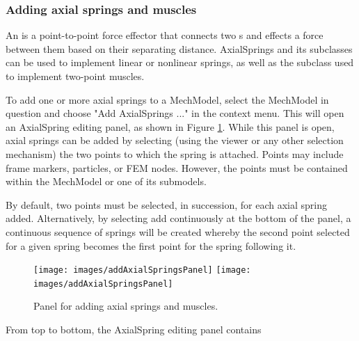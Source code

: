 \documentclass{article}
\begin{document}
\subsubsection{Adding axial springs and muscles}
\label{addingAxialSpringsSec}

An  is a point-to-point
force effector that connects two
s and effects a force between
them based on their separating distance. AxialSprings and its
subclasses can be used to implement linear or nonlinear springs, as
well as the subclass  used to
implement two-point muscles.

To add one or more axial springs to a MechModel, select the MechModel in
question and choose {\sf "Add AxialSprings ..."} in the context menu. This
will open an AxialSpring editing panel, as shown in
Figure \ref{addAxialSpringsPanelFig}. While this panel is open, axial springs can
be added by selecting (using the viewer or any other selection
mechanism) the two points to which the spring is attached.  Points may
include frame markers, particles, or FEM nodes.  However, the points
must be contained within the MechModel or one of its submodels.

By default, two points must be selected, in succession, for each axial
spring added. Alternatively, by selecting {\sf add continuously} at the
bottom of the panel, a continuous sequence of springs will be created
whereby the second point selected for a given spring becomes the first
point for the spring following it.

\begin{figure}
\begin{center}
\iflatexml
\texttt{[image: images/addAxialSpringsPanel]}
\else
\texttt{[image: images/addAxialSpringsPanel]}
\fi
\end{center}
\caption{Panel for adding axial springs and muscles.}%
\label{addAxialSpringsPanelFig}
\end{figure}

From top to bottom, the AxialSpring editing panel contains
\end{document}
